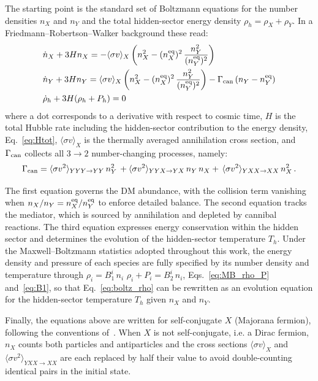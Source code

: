\documentclass[11pt]{article}
\numberwithin{equation}{section}
\newcommand{\sigmav}{\langle\sigma v\rangle}
\newcommand{\sigmavv}{\langle\sigma v^2\rangle}
\begin{document}
The starting point is the standard set of Boltzmann equations for the
number densities $n_X$ and $n_Y$ and the total hidden-sector energy
density $\rho_h = \rho_X + \rho_Y$.  In a Friedmann--Robertson--Walker background these read:
\begin{align}
    &\dot{n}_X + 3H n_X = -\sigmav_{X}\left(n_X^2 - (n_X^{\text{eq}})^2\,\frac{n_Y^2}{(n_Y^{\text{eq}})^2}\right) \label{eq:boltz_nX} \\
    &\dot{n}_Y + 3H n_Y = \sigmav_{X}\left(n_X^2 - (n_X^{\text{eq}})^2\,\frac{n_Y^2}{(n_Y^{\text{eq}})^2}\right) - \Gamma_{\rm can}\,(n_Y - n_Y^{\text{eq}}) \label{eq:boltz_nY} \\
    &\dot{\rho}_h + 3H(\rho_h + P_h) = 0 \label{eq:boltz_rho}
\end{align}
where a dot corresponds to a derivative with respect to cosmic time, $H$ is the total Hubble rate including the hidden-sector contribution to the energy density, Eq.~\eqref{eq:Htot}, $\sigmav_{X}$ is the thermally averaged annihilation cross section, and $\Gamma_{\rm can}$ collects all $3\to2$ number-changing processes, namely:
\begin{equation}
  \Gamma_{\rm can} = \langle\sigma v^2\rangle_{YYY\to YY}\,n_Y^2\,+\langle\sigma v^2\rangle_{YYX\to YX}\,n_Y\,n_X+\,
\langle\sigma v^2\rangle_{YXX\to XX}\,n_X^2\,.
\label{eq:Gamma_can_std}
\end{equation}


The first equation governs the DM abundance, with the collision term vanishing when $n_X/n_Y = n_X^{\rm eq}/n_Y^{\rm eq}$ to enforce detailed balance. The second equation tracks the mediator, which is sourced by annihilation and depleted by cannibal reactions. The third equation expresses energy conservation within the hidden sector and determines the evolution of the hidden-sector temperature $T_h$. Under the Maxwell--Boltzmann statistics  adopted throughout this work, the energy density and pressure of each species are fully specified by its number density and temperature through $\rho_i = B_1^i\,n_i$ $\rho_i + P_i =B_2^i\, n_i$, Eqs.~\eqref{eq:MB_rho_P} and~\eqref{eq:B1}, so that Eq.~\eqref{eq:boltz_rho} can be rewritten as an evolution equation for the hidden-sector temperature $T_h$ given $n_X$ and $n_Y$. 

Finally, the equations above are written for self-conjugate $X$ (Majorana fermion), following the conventions of~\cite{Berlin:2016gtr}. When $X$ is not self-conjugate, i.e. a Dirac fermion, $n_X$ counts both particles and antiparticles and the cross sections $\sigmav_X$ and $\sigmavv_{YXX\to XX}$ are each replaced by half their value to avoid double-counting identical pairs in the initial state.
\end{document}
